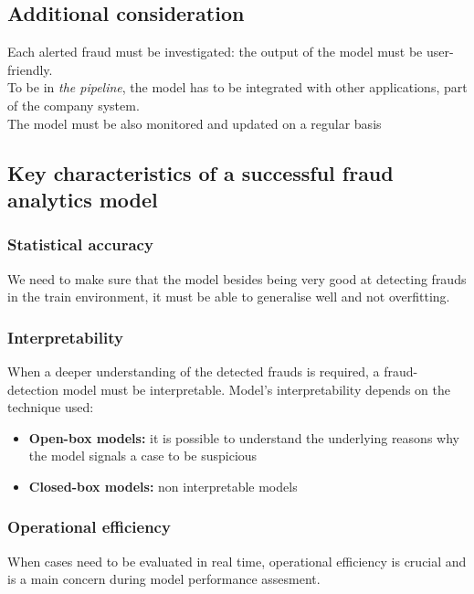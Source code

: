     \subsection{Additional consideration}
        Each alerted fraud must be investigated: the output of the model must be user-friendly.\\
        To be in \textit{the pipeline}, the model has to be integrated with other applications, part of the company system.\\
        The model must be also monitored and updated on a regular basis 
    \subsection{Key characteristics of a successful fraud analytics model}
        \subsubsection{Statistical accuracy}
            We need to make sure that the model besides being very good at detecting frauds in the train environment, it must be able to generalise well and not overfitting.
        \subsubsection{Interpretability}
            When a deeper understanding of the detected frauds is required, a fraud-detection model must be interpretable. Model's interpretability depends on the technique used:
            \begin{itemize}
                \item \textbf{Open-box models:} it is possible to understand the underlying reasons why the model signals a case to be suspicious
                \item \textbf{Closed-box models:} non interpretable models
            \end{itemize}
        \subsubsection{Operational efficiency}
            When cases need to be evaluated in real time, operational efficiency is crucial and is a main concern during model performance assesment.
